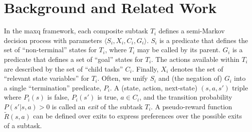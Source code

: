 \section{Background and Related Work}
\label{sec:relwork}


In the {\sc maxq} framework, each composite subtask $T_i$ defines a
semi-Markov decision process  with parameters $\langle
S_i,X_i,C_i,G_i \rangle$. $S_i$ is a predicate that defines the set of
``non-terminal'' states for $T_i$, where $T_i$ may be called by its
parent. $G_i$ is a predicate that defines a set of ``goal'' states for
$T_i$. 
The actions available
within $T_i$ are described by the set of ``child tasks'' $C_i$.
Finally, $X_i$ denotes the set of ``relevant state variables'' for
$T_i$. 
Often, we unify  $S_i$ and (the negation of) $G_i$ into a single
``termination'' predicate, $P_i$. A (state, action, next-state)
$(s,a,s')$ triple where $P_i(s)$ is false, $P_i(s')$ is true, $a \in
C_i$, and the transition probability $P(s'|s,a)>0$ is called an {\em
  exit} of the subtask $T_i$. A pseudo-reward function
$\tilde{R}(s,a)$ can be defined over exits to express preferences over
the possible exits of a subtask. 

